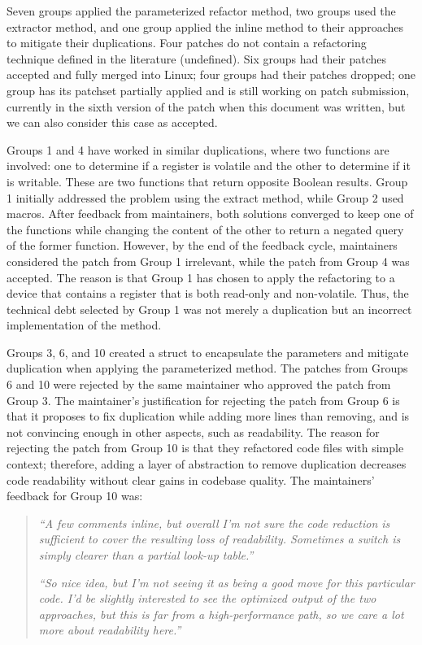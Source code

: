 \documentclass[10pt,conference]{IEEEtran}
\begin{document}
Seven groups applied the parameterized refactor method, two groups used the extractor method, and one group applied the inline method to their approaches to mitigate their duplications. Four patches do not contain a refactoring technique defined in the literature (undefined). Six groups had their patches accepted and fully merged into Linux; four groups had their patches dropped; one group has its patchset partially applied and is still working on patch submission, currently in the sixth version of the patch when this document was written, but we can also consider this case as accepted.

Groups 1 and 4 have worked in similar duplications, where two functions are involved: one to determine if a register is volatile and the other to determine if it is writable. These are two functions that return opposite Boolean results. Group 1 initially addressed the problem using the extract method, while Group 2 used macros. After feedback from maintainers, both solutions converged to keep one of the functions while changing the content of the other to return a negated query of the former function. However, by the end of the feedback cycle, maintainers considered the patch from Group 1 irrelevant, while the patch from Group 4 was accepted. The reason is that Group 1 has chosen to apply the refactoring to a device that contains a register that is both read-only and non-volatile. Thus, the technical debt selected by Group 1 was not merely a duplication but an incorrect implementation of the method.

Groups 3, 6, and 10 created a struct to encapsulate the parameters and mitigate duplication when applying the parameterized method. The patches from Groups 6 and 10 were rejected by the same maintainer who approved the patch from Group 3. The maintainer's justification for rejecting the patch from Group 6 is that it proposes to fix duplication while adding more lines than removing, and is not convincing enough in other aspects, such as readability. The reason for rejecting the patch from Group 10 is that they refactored code files with simple context; therefore, adding a layer of abstraction to remove duplication decreases code readability without clear gains in codebase quality. The maintainers' feedback for Group 10 was:
\begin{quote}

\textit{``A few comments inline, but overall I'm not sure the code reduction is sufficient to cover the resulting loss of readability. Sometimes a switch is simply clearer than a partial look-up table.''}

\textit{``So nice idea, but I'm not seeing it as being a good move for this particular code. I'd be slightly interested to see the optimized output of the two approaches, but this is far from a high-performance path, so we care a lot more about readability here.''} 
\end{quote}
\end{document}

